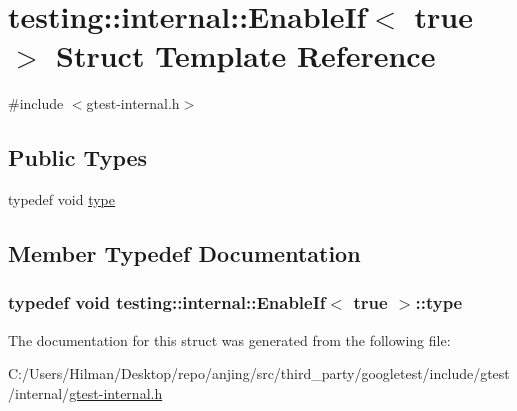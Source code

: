 \hypertarget{structtesting_1_1internal_1_1_enable_if_3_01true_01_4}{}\section{testing\+:\+:internal\+:\+:Enable\+If$<$ true $>$ Struct Template Reference}
\label{structtesting_1_1internal_1_1_enable_if_3_01true_01_4}


{\ttfamily \#include $<$gtest-\/internal.\+h$>$}

\subsection*{Public Types}
\begin{DoxyCompactItemize}
\item 
typedef void \hyperlink{structtesting_1_1internal_1_1_enable_if_3_01true_01_4_a9398d803f1fdd99ff41823746f6299ff}{type}
\end{DoxyCompactItemize}


\subsection{Member Typedef Documentation}
\hypertarget{structtesting_1_1internal_1_1_enable_if_3_01true_01_4_a9398d803f1fdd99ff41823746f6299ff}{}
\subsubsection[{type}]{\setlength{\rightskip}{0pt plus 5cm}typedef void {\bf testing\+::internal\+::\+Enable\+If}$<$ true $>$\+::{\bf type}}\label{structtesting_1_1internal_1_1_enable_if_3_01true_01_4_a9398d803f1fdd99ff41823746f6299ff}


The documentation for this struct was generated from the following file\+:\begin{DoxyCompactItemize}
\item 
C\+:/\+Users/\+Hilman/\+Desktop/repo/anjing/src/third\+\_\+party/googletest/include/gtest/internal/\hyperlink{gtest-internal_8h}{gtest-\/internal.\+h}\end{DoxyCompactItemize}
